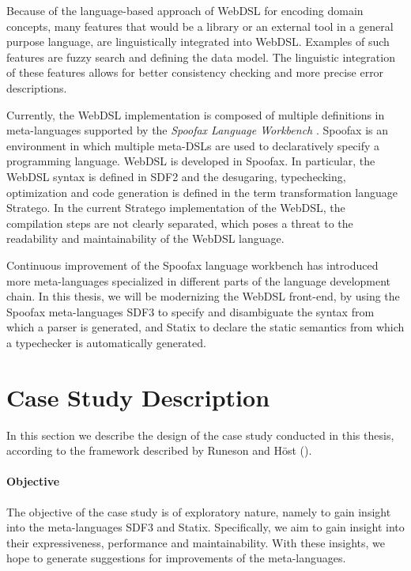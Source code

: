   Because of the language-based approach of WebDSL for encoding domain concepts, many features that would be a library or an external tool in a general purpose language, are linguistically integrated into WebDSL. Examples of such features are fuzzy search and defining the data model. The linguistic integration of these features allows for better consistency checking and more precise error descriptions.
  
  Currently, the WebDSL implementation is composed of multiple definitions in meta-languages supported by the \textit{Spoofax Language Workbench} \autocite{KatsV10}. Spoofax is an environment in which multiple meta-DSLs are used to declaratively specify a programming language. WebDSL is developed in Spoofax. In particular, the WebDSL syntax is defined in SDF2 and the desugaring, typechecking, optimization and code generation is defined in the term transformation language Stratego. In the current Stratego implementation of the WebDSL, the compilation steps are not clearly separated, which poses a threat to the readability and maintainability of the WebDSL language.

  Continuous improvement of the Spoofax language workbench has introduced more meta-languages specialized in different parts of the language development chain. In this thesis, we will be modernizing the WebDSL front-end, by using the Spoofax meta-languages SDF3 to specify and disambiguate the syntax from which a parser is generated, and Statix to declare the static semantics from which a typechecker is automatically generated.

  \section{\label{sec:methodology}Case Study Description}

    In this section we describe the design of the case study conducted in this thesis, according to the framework described by Runeson and H\"{o}st (\citeyear{RunesonH09}).

    \paragraph{Objective} The objective of the case study is of exploratory nature, namely to gain insight into the meta-languages SDF3 and Statix. Specifically, we aim to gain insight into their expressiveness, performance and maintainability. With these insights, we hope to generate suggestions for improvements of the meta-languages.

